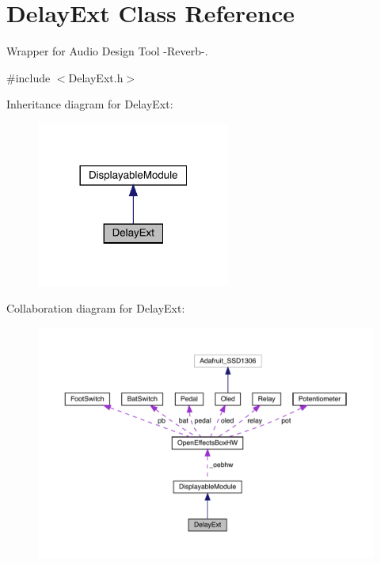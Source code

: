 \hypertarget{class_delay_ext}{}\section{Delay\+Ext Class Reference}
\label{class_delay_ext}


Wrapper for Audio Design Tool -\/\+Reverb-\/.  




{\ttfamily \#include $<$Delay\+Ext.\+h$>$}



Inheritance diagram for Delay\+Ext\+:
\nopagebreak
\begin{figure}[H]
\begin{center}
\leavevmode
\includegraphics[width=180pt]{class_delay_ext__inherit__graph}
\end{center}
\end{figure}


Collaboration diagram for Delay\+Ext\+:
\nopagebreak
\begin{figure}[H]
\begin{center}
\leavevmode
\includegraphics[width=350pt]{class_delay_ext__coll__graph}
\end{center}
\end{figure}
